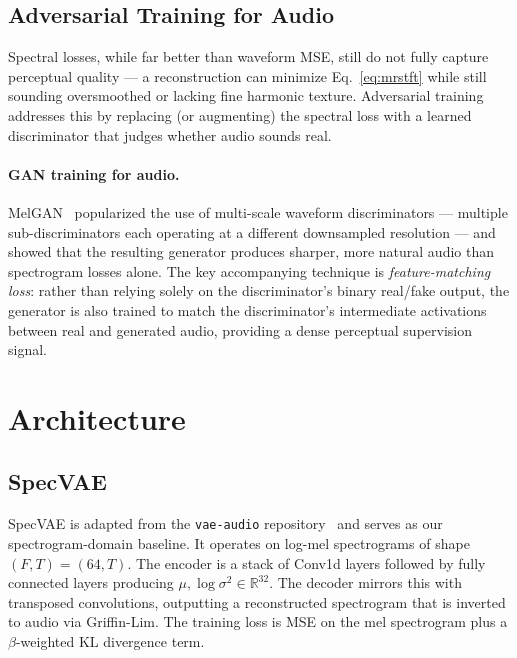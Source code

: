 \documentclass[10pt, twocolumn]{article}
\begin{document}
\subsection{Adversarial Training for Audio}

Spectral losses, while far better than waveform MSE, still do not fully capture perceptual
quality --- a reconstruction can minimize Eq.~\ref{eq:mrstft} while still
sounding oversmoothed or lacking fine harmonic texture.
Adversarial training addresses this by replacing (or augmenting) the
spectral loss with a learned discriminator that judges whether audio
sounds real.

\paragraph{GAN training for audio.}
MelGAN~\cite{kumar2019melgangenerativeadversarialnetworks} popularized the use of multi-scale waveform
discriminators --- multiple sub-discriminators each operating at a
different downsampled resolution --- and showed that the resulting
generator produces sharper, more natural audio than spectrogram losses
alone. The key accompanying technique is \textit{feature-matching loss}:
rather than relying solely on the discriminator's binary real/fake
output, the generator is also trained to match the discriminator's
intermediate activations between real and generated audio, providing a
dense perceptual supervision signal.

\section{Architecture}
\label{sec:arch}

\subsection{SpecVAE}

SpecVAE is adapted from the \texttt{vae-audio} repository~\cite{yjlolo}
and serves as our spectrogram-domain baseline.
It operates on log-mel spectrograms of shape $(F, T) = (64, T)$.
The encoder is a stack of Conv1d layers followed by fully connected
layers producing $\mu, \log\sigma^2 \in \mathbb{R}^{32}$.
The decoder mirrors this with transposed convolutions, outputting a
reconstructed spectrogram that is inverted to audio via Griffin-Lim.
The training loss is MSE on the mel spectrogram plus a $\beta$-weighted
KL divergence term.
\end{document}
